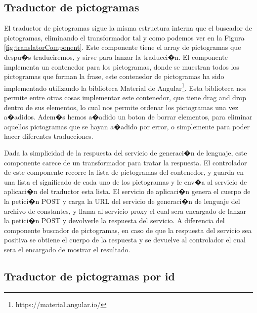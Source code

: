\subsection{Traductor de pictogramas} 

El traductor de pictogramas sigue la misma estructura interna que el buscador de pictogramas, eliminando el transformador tal y como podemos ver en la Figura \ref{fig:translatorComponent}. Este componente tiene el array de pictogramas que despu�s traduciremos, y sirve para lanzar la traducci�n.
El componente implementa un contenedor para los pictogramas, donde se muestran todos los pictogramas que forman la frase, este contenedor de pictogramas ha sido implementado utilizando la biblioteca Material de Angular\footnote{https://material.angular.io/}. Esta biblioteca nos permite entre otras cosas implementar este contenedor, que tiene drag and drop dentro de sus elementos, lo cual nos permite ordenar los pictogramas una vez a�adidos. Adem�s hemos a�adido un boton de borrar elementos, para eliminar aquellos pictogramas que se hayan a�adido por error, o simplemente para poder hacer diferentes traducciones.

Dada la simplicidad de la respuesta del servicio de generaci�n de lenguaje, este componente carece de un transformador para tratar la respuesta. El controlador de este componente recorre la lista de pictogramas del contenedor, y guarda en una lista el significado de cada uno de los pictogramas y le env�a al servicio de aplicaci�n del traductor esta lista.
El servicio de aplicaci�n genera el cuerpo de la petici�n POST y carga la URL del servicio de generaci�n de lenguaje del archivo de constantes, y llama al servicio proxy el cual sera encargado de lanzar la petici�n POST y devolverle la respuesta del servicio.
A diferencia del componente buscador de pictogramas, en caso de que la respuesta del servicio sea positiva se obtiene el cuerpo de la respuesta y se devuelve al controlador el cual sera el encargado de mostrar el resultado.

\subsection{Traductor de pictogramas por id}

